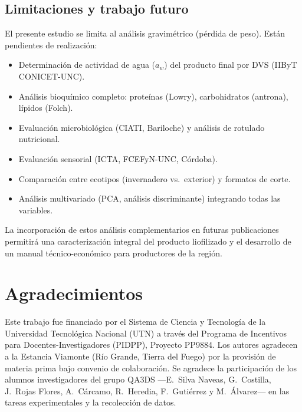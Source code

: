 \documentclass[12pt, a4paper]{article}
\begin{document}
\subsection*{Limitaciones y trabajo futuro}

El presente estudio se limita al análisis gravimétrico (pérdida de peso). Están pendientes de realización:

\begin{itemize}
    \item Determinación de actividad de agua ($a_w$) del producto final por DVS (IIByT CONICET-UNC).
    \item Análisis bioquímico completo: proteínas (Lowry), carbohidratos (antrona), lípidos (Folch).
    \item Evaluación microbiológica (CIATI, Bariloche) y análisis de rotulado nutricional.
    \item Evaluación sensorial (ICTA, FCEFyN-UNC, Córdoba).
    \item Comparación entre ecotipos (invernadero vs.\ exterior) y formatos de corte.
    \item Análisis multivariado (PCA, análisis discriminante) integrando todas las variables.
\end{itemize}

La incorporación de estos análisis complementarios en futuras publicaciones permitirá una caracterización integral del producto liofilizado y el desarrollo de un manual técnico-económico para productores de la región.

\section*{Agradecimientos}

Este trabajo fue financiado por el Sistema de Ciencia y Tecnología de la Universidad Tecnológica Nacional (UTN) a través del Programa de Incentivos para Docentes-Investigadores (PIDPP), Proyecto PP9884. Los autores agradecen a la Estancia Viamonte (Río Grande, Tierra del Fuego) por la provisión de materia prima bajo convenio de colaboración. Se agradece la participación de los alumnos investigadores del grupo QA3DS ---E.\ Silva Naveas, G.\ Costilla, J.\ Rojas Flores, A.\ Cárcamo, R.\ Heredia, F.\ Gutiérrez y M.\ Álvarez--- en las tareas experimentales y la recolección de datos.
\end{document}
